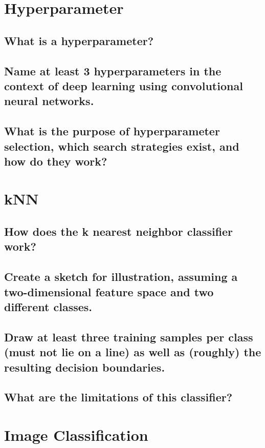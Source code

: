\section{Hyperparameter}

\subsection{What is a hyperparameter?}

\subsection{Name at least 3 hyperparameters in the context of deep learning using convolutional neural networks.}

\subsection{What is the purpose of hyperparameter selection, which search strategies exist, and how do they work?}

\section{kNN}

\subsection{How does the k nearest neighbor classifier work?}

\subsection{Create a sketch for illustration, assuming a two-dimensional feature space and two different classes.}

\subsection{Draw at least three training samples per class (must not lie on a line) as well as (roughly) the resulting decision boundaries.}

\subsection{What are the limitations of this classifier?}

\section{Image Classification}

